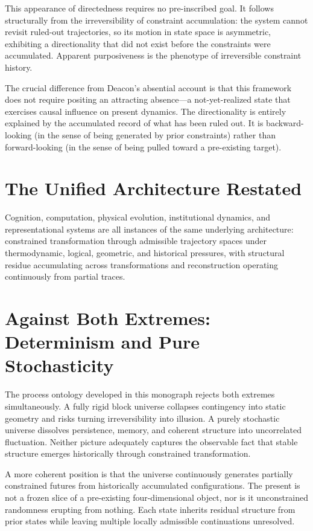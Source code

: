 This appearance of directedness requires no pre-inscribed goal. It follows
structurally from the irreversibility of constraint accumulation: the system cannot
revisit ruled-out trajectories, so its motion in state space is asymmetric,
exhibiting a directionality that did not exist before the constraints were
accumulated. Apparent purposiveness is the phenotype of irreversible constraint
history.

The crucial difference from Deacon's absential account is that this framework does
not require positing an attracting absence---a not-yet-realized state that exercises
causal influence on present dynamics. The directionality is entirely explained by
the accumulated record of what has been ruled out. It is backward-looking (in the
sense of being generated by prior constraints) rather than forward-looking (in the
sense of being pulled toward a pre-existing target).

\section{The Unified Architecture Restated}

Cognition, computation, physical evolution, institutional dynamics, and
representational systems are all instances of the same underlying architecture:
constrained transformation through admissible trajectory spaces under
thermodynamic, logical, geometric, and historical pressures, with structural
residue accumulating across transformations and reconstruction operating
continuously from partial traces.

\section{Against Both Extremes: Determinism and Pure Stochasticity}

The process ontology developed in this monograph rejects both extremes
simultaneously. A fully rigid block universe collapses contingency into static
geometry and risks turning irreversibility into illusion. A purely stochastic
universe dissolves persistence, memory, and coherent structure into uncorrelated
fluctuation. Neither picture adequately captures the observable fact that stable
structure emerges historically through constrained transformation.

A more coherent position is that the universe continuously generates partially
constrained futures from historically accumulated configurations. The present
is not a frozen slice of a pre-existing four-dimensional object, nor is it
unconstrained randomness erupting from nothing. Each state inherits residual
structure from prior states while leaving multiple locally admissible
continuations unresolved.

